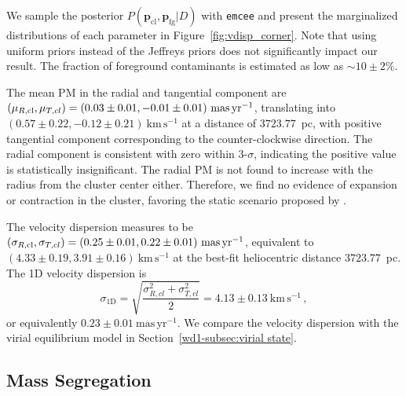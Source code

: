\documentclass[12pt]{ucsddissertation}
\begin{document}
\begin{CJK*}{UTF8}{gbsn}
We sample the posterior $P(\boldsymbol{p_\mathrm{cl}, \boldsymbol{p_\mathrm{fg}}}|D)$ with \texttt{emcee} \citep[][]{emcee} and present the marginalized distributions of each parameter in 
Figure~\ref{fig:vdisp_corner}. Note that using uniform priors instead of the Jeffreys priors does not significantly impact our result. The fraction of foreground contaminants is estimated as low as $\sim10 \pm 2\%$. 

The mean PM in the radial and tangential component are $\left(\mu_{R, \mathrm{cl}}, \mu_{T, cl}\right) =\linebreak[4] (0.03 \pm 0.01, -0.01 \pm 0.01)~\mathrm{mas}\,\mathrm{yr}^{-1}$, translating into $\left(0.57 \pm 0.22, -0.12 \pm 0.21\right)~\mathrm{km}\,\mathrm{s}^{-1}$ at a distance of $3723.77$~pc, with positive tangential component corresponding to the counter-clockwise direction. The radial component is consistent with zero within $3$-$\sigma$, indicating the positive value is statistically insignificant. The radial PM is not found to increase with the radius from the cluster center either. Therefore, we find no evidence of expansion or contraction in the cluster, favoring the static scenario proposed by \citet{Gennaro-2017}. 

The velocity dispersion measures to be $(\sigma_{R, \mathrm{cl}},\sigma_{T, cl}) = (0.25 \pm 0.01,\linebreak[4] 0.22 \pm 0.01)~\rm mas\,yr^{-1}$, equivalent to $(4.33 \pm 0.19, 3.91 \pm 0.16)~\mathrm{km}\,\mathrm{s}^{-1}$ at the best-fit heliocentric distance $3723.77$~pc. The 1D velocity dispersion is 
\begin{equation}
    \sigma_\mathrm{1D} = \sqrt{\frac{\sigma_{R, cl}^2 + \sigma_{T, cl}^2}{2}} = 4.13 \pm 0.13~\mathrm{km}\,\mathrm{s}^{-1}\,,
    \label{eq:vdisp_1d}
\end{equation}
or equivalently $0.23 \pm 0.01~\mathrm{mas}\,\mathrm{yr}^{-1}$. We compare the velocity dispersion with the virial equilibrium model in Section~\ref{wd1-subsec:virial state}.



\subsection{Mass Segregation}
\label{wd1-subsec:mass_segregation}


\end{CJK*}
\end{document}
